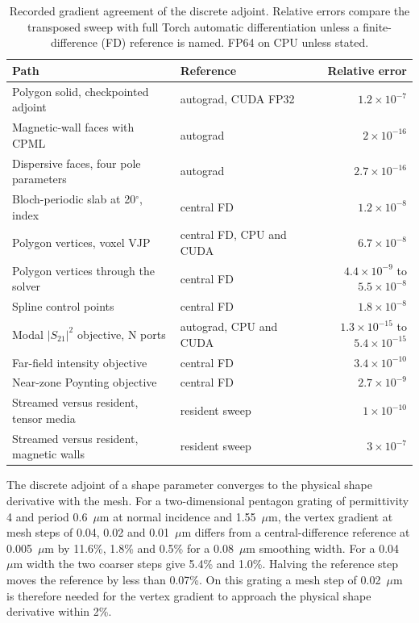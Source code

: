 \documentclass[11pt,a4paper]{article}
\newcommand{\micron}{\ensuremath{\mu\mathrm{m}}}
\begin{document}
\begin{table}[tbp]
\centering
\small
\renewcommand{\arraystretch}{1.15}
\caption{Recorded gradient agreement of the discrete adjoint. Relative errors compare the transposed sweep with full Torch automatic differentiation unless a finite-difference (FD) reference is named. FP64 on CPU unless stated.}
\label{tab:gradients}
\setlength{\tabcolsep}{3pt}
\begin{tabular}{@{}llr@{}}
\toprule
Path & Reference & Relative error \\
\midrule
Polygon solid, checkpointed adjoint & autograd, CUDA FP32 & $1.2\times10^{-7}$ \\
Magnetic-wall faces with CPML & autograd & $2\times10^{-16}$ \\
Dispersive faces, four pole parameters & autograd & $2.7\times10^{-16}$ \\
Bloch-periodic slab at 20$^\circ$, index & central FD & $1.2\times10^{-8}$ \\
Polygon vertices, voxel VJP & central FD, CPU and CUDA & $6.7\times10^{-8}$ \\
Polygon vertices through the solver & central FD & $4.4\times10^{-9}$ to $5.5\times10^{-8}$ \\
Spline control points & central FD & $1.8\times10^{-8}$ \\
Modal $|S_{21}|^{2}$ objective, N ports & autograd, CPU and CUDA & $1.3\times10^{-15}$ to $5.4\times10^{-15}$ \\
Far-field intensity objective & central FD & $3.4\times10^{-10}$ \\
Near-zone Poynting objective & central FD & $2.7\times10^{-9}$ \\
Streamed versus resident, tensor media & resident sweep & $1\times10^{-10}$ \\
Streamed versus resident, magnetic walls & resident sweep & $3\times10^{-7}$ \\
\bottomrule
\end{tabular}
\end{table}

The discrete adjoint of a shape parameter converges to the physical shape derivative with the mesh. For a two-dimensional pentagon grating of permittivity 4 and period 0.6~\micron{} at normal incidence and 1.55~\micron{}, the vertex gradient at mesh steps of 0.04, 0.02 and 0.01~\micron{} differs from a central-difference reference at 0.005~\micron{} by 11.6\%, 1.8\% and 0.5\% for a 0.08~\micron{} smoothing width. For a 0.04~\micron{} width the two coarser steps give 5.4\% and 1.0\%. Halving the reference step moves the reference by less than 0.07\%. On this grating a mesh step of 0.02~\micron{} is therefore needed for the vertex gradient to approach the physical shape derivative within 2\%.
\end{document}
